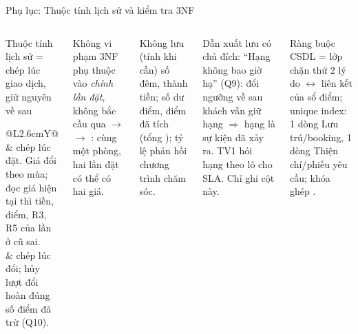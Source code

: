 \begin{frame}{Phụ lục: Thuộc tính lịch sử và kiểm tra 3NF \TB}
\begin{columns}[T]
\begin{block}{Thuộc tính lịch sử = chép lúc giao dịch, giữ nguyên về sau}
\scriptsize
\begin{tabularx}{\linewidth}{@{}L{2.6cm}Y@{}}
\newline{} & chép  lúc đặt. Giá đổi theo mùa; đọc giá hiện tại thì tiền, điểm, R3, R5 của lần ở cũ sai. \\[1mm]
\newline{} & chép  lúc đổi; hủy lượt đổi hoàn đúng số điểm đã trừ (Q10). \\
\end{tabularx}
\end{block}
\begin{alertblock}{Không vi phạm 3NF}
\scriptsize
{} phụ thuộc vào \emph{chính lần đặt}, không bắc cầu qua  $\to$  $\to$ : cùng một phòng, hai lần đặt có thể có hai giá.
\end{alertblock}
\begin{block}{Không lưu (tính khi cần)}
\scriptsize
số đêm, thành tiền; số dư điểm, điểm đã tích (tổng ); tỷ lệ phản hồi chương trình chăm sóc.
\end{block}
\begin{block}{Dẫn xuất lưu có chủ đích: }
\scriptsize
``Hạng không bao giờ hạ'' (Q9): đổi ngưỡng về sau khách vẫn giữ hạng $\Rightarrow$ hạng là sự kiện đã xảy ra. TV1 hỏi hạng theo lô cho SLA. Chỉ  ghi cột này.
\end{block}
\begin{block}{Ràng buộc CSDL = lớp chặn thứ 2}
\scriptsize
{} lý do $\leftrightarrow$ liên kết của sổ điểm; unique index: 1 dòng Lưu trú/booking, 1 dòng Thiện chí/phiếu yêu cầu; khóa ghép .
\end{block}
\end{columns}
\end{frame}

